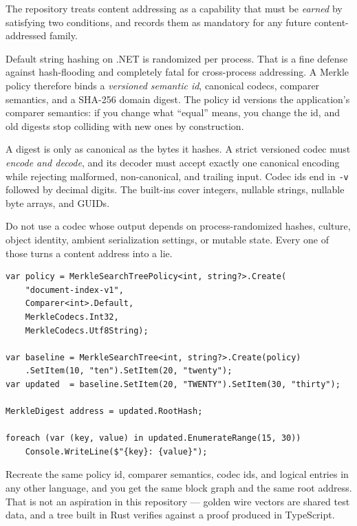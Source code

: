\documentclass[11pt,twoside,openright]{book}
\newcommand{\code}[1]{\texorpdfstring{\textcolor{d7ink}{\texttt{#1}}}{#1}}
\begin{document}
The repository treats content addressing as a capability that must be
\emph{earned} by satisfying two conditions, and records them as mandatory for
any future content-addressed family.

\begin{contractbox}
Default string hashing on .NET is randomized per process. That is a fine defense
against hash-flooding and completely fatal for cross-process addressing. A
Merkle policy therefore binds a \emph{versioned semantic id}, canonical codecs,
comparer semantics, and a SHA-256 domain digest. The policy id versions the
application's comparer semantics: if you change what ``equal'' means, you change
the id, and old digests stop colliding with new ones by construction.
\end{contractbox}

\begin{contractbox}
A digest is only as canonical as the bytes it hashes. A strict versioned codec
must \emph{encode and decode}, and its decoder must accept exactly one canonical
encoding while rejecting malformed, non-canonical, and trailing input. Codec ids
end in \code{-v} followed by decimal digits. The built-ins cover integers,
nullable strings, nullable byte arrays, and GUIDs.

Do not use a codec whose output depends on process-randomized hashes, culture,
object identity, ambient serialization settings, or mutable state. Every one of
those turns a content address into a lie.
\end{contractbox}

\begin{lstlisting}[language={[Sharp]C}]
var policy = MerkleSearchTreePolicy<int, string?>.Create(
    "document-index-v1",
    Comparer<int>.Default,
    MerkleCodecs.Int32,
    MerkleCodecs.Utf8String);

var baseline = MerkleSearchTree<int, string?>.Create(policy)
    .SetItem(10, "ten").SetItem(20, "twenty");
var updated  = baseline.SetItem(20, "TWENTY").SetItem(30, "thirty");

MerkleDigest address = updated.RootHash;

foreach (var (key, value) in updated.EnumerateRange(15, 30))
    Console.WriteLine($"{key}: {value}");
\end{lstlisting}

Recreate the same policy id, comparer semantics, codec ids, and logical entries
in any other language, and you get the same block graph and the same root
address. That is not an aspiration in this repository --- golden wire vectors are
shared test data, and a tree built in Rust verifies against a proof produced in
TypeScript.
\end{document}
